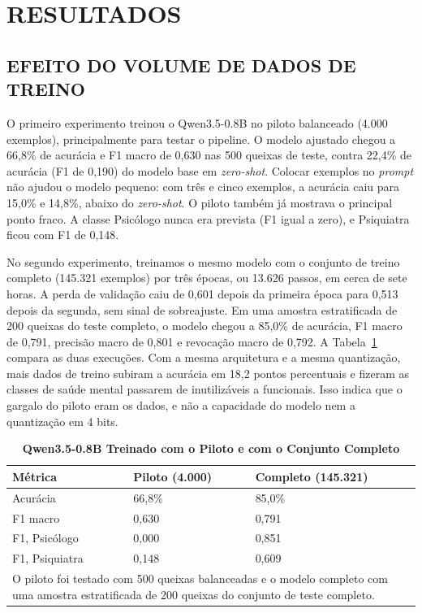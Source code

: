 \documentclass{ieeeaccess}
\begin{document}
\section{RESULTADOS}
\label{sec:resultados}

\subsection{EFEITO DO VOLUME DE DADOS DE TREINO}
O primeiro experimento treinou o Qwen3.5-0.8B no piloto balanceado (4.000 exemplos), principalmente para testar o pipeline. O modelo ajustado chegou a 66,8\% de acur\'acia e F1 macro de 0,630 nas 500 queixas de teste, contra 22,4\% de acur\'acia (F1 de 0,190) do modelo base em \emph{zero-shot}. Colocar exemplos no \emph{prompt} n\~ao ajudou o modelo pequeno: com tr\^es e cinco exemplos, a acur\'acia caiu para 15,0\% e 14,8\%, abaixo do \emph{zero-shot}. O piloto tamb\'em j\'a mostrava o principal ponto fraco. A classe Psic\'ologo nunca era prevista (F1 igual a zero), e Psiquiatra ficou com F1 de 0,148.

No segundo experimento, treinamos o mesmo modelo com o conjunto de treino completo (145.321 exemplos) por tr\^es \'epocas, ou 13.626 passos, em cerca de sete horas. A perda de valida\c{c}\~ao caiu de 0,601 depois da primeira \'epoca para 0,513 depois da segunda, sem sinal de sobreajuste. Em uma amostra estratificada de 200 queixas do teste completo, o modelo chegou a 85,0\% de acur\'acia, F1 macro de 0,791, precis\~ao macro de 0,801 e revoca\c{c}\~ao macro de 0,792. A Tabela~\ref{tab:volume} compara as duas execu\c{c}\~oes. Com a mesma arquitetura e a mesma quantiza\c{c}\~ao, mais dados de treino subiram a acur\'acia em 18,2 pontos percentuais e fizeram as classes de sa\'ude mental passarem de inutiliz\'aveis a funcionais. Isso indica que o gargalo do piloto eram os dados, e n\~ao a capacidade do modelo nem a quantiza\c{c}\~ao em 4 bits.

\begin{table}[!t]
\caption{\textbf{Qwen3.5-0.8B Treinado com o Piloto e com o Conjunto Completo}}
\label{tab:volume}
\setlength{\tabcolsep}{3pt}
\begin{tabular}{p{80pt}p{70pt}p{80pt}}
\hline
\textbf{M\'etrica} & \textbf{Piloto (4.000)} & \textbf{Completo (145.321)} \\
\hline
Acur\'acia & 66,8\% & 85,0\% \\
F1 macro & 0,630 & 0,791 \\
F1, Psic\'ologo & 0,000 & 0,851 \\
F1, Psiquiatra & 0,148 & 0,609 \\
\hline
\multicolumn{3}{p{238pt}}{O piloto foi testado com 500 queixas balanceadas e o modelo completo com uma amostra estratificada de 200 queixas do conjunto de teste completo.}
\end{tabular}
\end{table}
\end{document}
